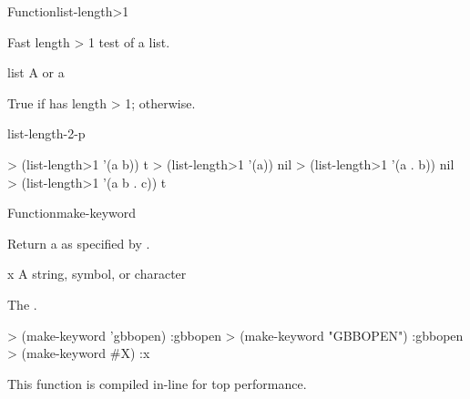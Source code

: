 \documentclass[10pt,twoside,english,pdftex]{article}
\newcommand{\inline}{This function is compiled in-line for top performance.}
\begin{document}

\begin{functiondoc}{Function}{list-length>1}%
  {
    \returns{} }
%
%

\fnsyntax

\fnpurpose Fast length > 1 test of a list.

\fnpackage {}

\fnmodule {}

\fnargs
\begin{args}{list}
\arg[list] A  or a 
\end{args}

\fnreturns True if  has length > 1; \nil{} otherwise.

\begin{alsos}{list-length-2-p}
\end{alsos}

\fnexamples
%
\W\supp
\begin{example}
> (list-length>1 '(a b))
t
> (list-length>1 '(a))
nil\goodpagebreak
> (list-length>1 '(a . b))
nil
> (list-length>1 '(a b . c))
t
\end{example}

\end{functiondoc}


\begin{functiondoc}{Function}{make-keyword}{
    \returns{} } 
%
%
  
\fnsyntax

\fnpurpose Return a  as specified by .

\fnpackage {}

\fnmodule {}

\fnargs
\begin{args}{x}
\arg[x] A string, symbol, or character
\end{args}

\fnreturns The .

\fnexamples
%
\W\supp
\begin{example}
> (make-keyword 'gbbopen)
:gbbopen
> (make-keyword "GBBOPEN")
:gbbopen
> (make-keyword #\bkslash{}X)
:x
\end{example}

\fnnote \inline

\end{functiondoc}
\end{document}

